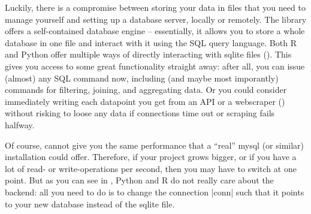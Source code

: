 Luckily, there is a compromise between storing your data in files
that you need to manage yourself and setting up a database server,
locally or remotely. The library  offers a self-contained
database engine -- essentially, it allows you to store a whole
database in one file and interact with it using the SQL query language.
Both R and Python offer multiple ways of directly interacting with
sqlite files (). This gives you access to some great
functionality straight away: after all, you can issue (almost) any SQL command
now, including (and maybe most imporantly) commands for filtering,
joining, and aggregating data. Or you could consider immediately writing
each datapoint you get from an API or a webscraper ()
without risking to loose any data if connections time out or scraping
fails halfway.


Of course,  cannot give you the same performance that a ``real'' mysql (or similar) installation could offer. Therefore, if your project grows bigger, or if you have a lot of read- or
write-operations per second, then you may have to switch at one
point. But as you can see in , Python and R do not
really care about the backend: all you need to do is to change the
connection |conn| such that it points to your new database instead of
the sqlite file.


